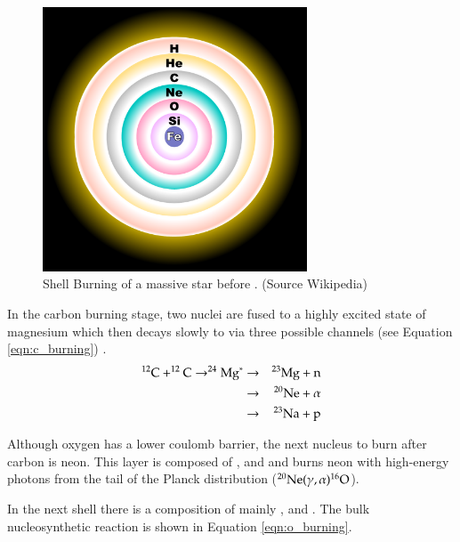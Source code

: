 \begin{figure}[t] %
   \centering
   \includegraphics[width=0.7\textwidth]{chapter_intro/plots/fusion_shells.pdf} 
   \caption[Shell Burning of a massive star before SN II]{Shell Burning of a massive star before . (Source  Wikipedia)}
   \label{fig:fusion_shells}
\end{figure}


In the carbon burning stage, two  nuclei are fused to a highly excited state of  magnesium which then decays slowly to via three possible channels (see Equation \ref{eqn:c_burning}) .
\begin{eqnarray}
\nucl{C}{12}+\nucl{C}{12}\rightarrow \nucl{Mg}{24}^{*}&\rightarrow&\nucl{Mg}{23}+\textrm{n} \nonumber \\
	&\rightarrow&\nucl{Ne}{20} + \alpha \nonumber \\
	&\rightarrow&\nucl{Na}{23} + \textrm{p} \nonumber \\
	\label{eqn:c_burning}
\end{eqnarray}

Although oxygen has a lower coulomb barrier, the next nucleus to burn after carbon is neon. This layer is composed of  ,  and  and burns neon with high-energy photons from the tail of the Planck distribution ($\nucl{Ne}{20}(\gamma,\alpha)\nucl{O}{16}$). 

In the next shell there is a composition of mainly ,  and . The bulk nucleosynthetic reaction is shown in Equation \ref{eqn:o_burning}. 

